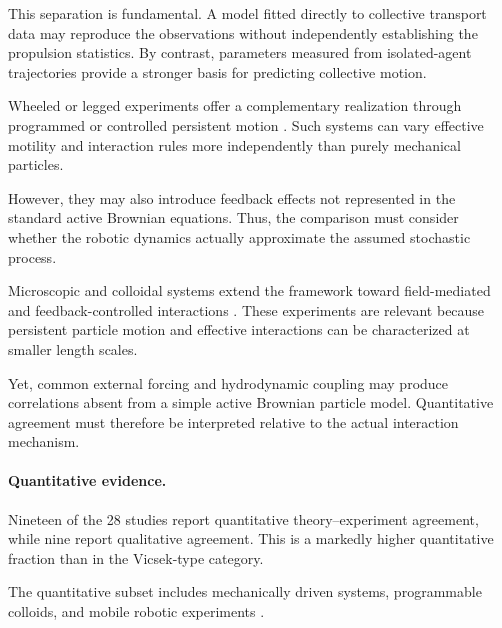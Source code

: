 This separation is fundamental.
A model fitted directly to
collective transport data
may reproduce the observations
without independently establishing
the propulsion statistics.
By contrast, parameters measured
from isolated-agent trajectories
provide a stronger basis
for predicting collective motion.

Wheeled or legged experiments
offer a complementary realization
through programmed or controlled
persistent motion
\cite{Paramanick2025spontaneousemergenc,Barone2024experimentalandnum,Mijalkov2016engineeringsensoria,Mayya2019nonuniformrobotde,Hao2022controllingcollisio}.
Such systems can vary effective
motility and interaction rules
more independently than purely
mechanical particles.

However, they may also introduce
feedback effects not represented
in the standard active Brownian
equations. Thus, the comparison
must consider whether the
robotic dynamics actually
approximate the assumed
stochastic process.

Microscopic and colloidal systems
extend the framework toward
field-mediated and feedback-controlled
interactions
\cite{Rivas2023spatialpatterningo,Raghavendra2026programmablepersist,Desgranges2023microswimmersunder,Knippenberg2022roleofcohesionin,Guo2026afeedbackcontrolle}.
These experiments are relevant
because persistent particle motion
and effective interactions can
be characterized at smaller
length scales.

Yet, common external forcing
and hydrodynamic coupling may
produce correlations absent
from a simple active Brownian
particle model. Quantitative
agreement must therefore be
interpreted relative to the
actual interaction mechanism.

\paragraph*{Quantitative evidence.}

Nineteen of the 28 studies report
quantitative theory--experiment
agreement, while nine report
qualitative agreement. This is
a markedly higher quantitative
fraction than in the Vicsek-type
category.

The quantitative subset includes
mechanically driven systems,
programmable colloids, and
mobile robotic experiments
\cite{Balda2022playingwithactive,Musacchio2026activeembracemente,Arbel2025amechanicalroutef,Knippenberg2022roleofcohesionin,Raghavendra2026programmablepersist,Desgranges2023microswimmersunder,Guo2026afeedbackcontrolle,Paramanick2025spontaneousemergenc,Musacchio2026fluidizationinduced,Barone2024experimentalandnum,Mijalkov2016engineeringsensoria,Hao2022controllingcollisio,Callegari2023playingwithactive,Balda2024playingwithactive,Li2021programmingactivec,Siebers2023exploitingcompositi,Zion2023morphologicalcomput,Wagner2026geometryinducedtra,Zion2021distributedonline}.

